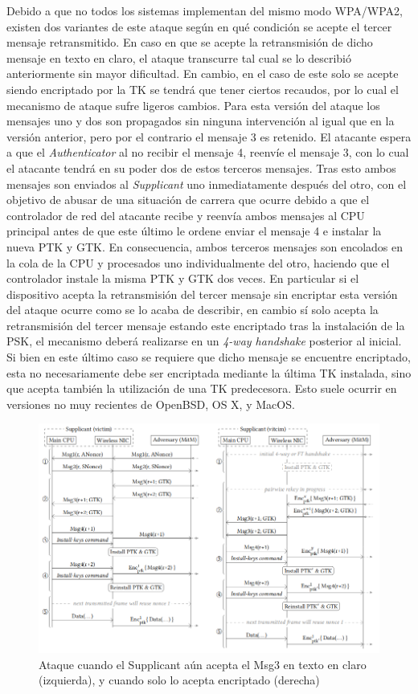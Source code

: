 \documentclass[10pt,a4paper]{article}
\begin{document}
Debido a que no todos los sistemas implementan del mismo modo WPA/WPA2, existen dos variantes de este ataque según en qué condición se acepte el tercer mensaje retransmitido. En caso en que se acepte la retransmisión de dicho mensaje en texto en claro, el ataque transcurre tal cual se lo describió anteriormente sin mayor dificultad. En cambio, en el caso de este solo se acepte siendo encriptado por la TK se tendrá que tener ciertos recaudos, por lo cual el mecanismo de ataque sufre ligeros cambios. Para esta versión del ataque los mensajes uno y dos son propagados sin ninguna intervención al igual que en la versión anterior, pero por el contrario el mensaje 3 es retenido. El atacante espera a que el \textit{Authenticator} al no recibir el mensaje 4, reenvíe el mensaje 3, con lo cual el atacante tendrá en su poder dos de estos terceros mensajes. Tras esto ambos mensajes son enviados al \textit{Supplicant} uno inmediatamente después del otro, con el objetivo de abusar de una situación de carrera que ocurre debido a que el controlador de red del atacante recibe y reenvía ambos mensajes al CPU principal antes de que este último le ordene enviar el mensaje 4 e instalar la nueva PTK y GTK. En consecuencia, ambos terceros mensajes son encolados en la cola de la CPU y procesados uno individualmente del otro, haciendo que el controlador instale la misma PTK y GTK dos veces. En particular si el dispositivo acepta la retransmisión del tercer mensaje sin encriptar esta versión del ataque ocurre como se lo acaba de describir, en cambio sí solo acepta la retransmisión del tercer mensaje estando este encriptado tras la instalación de la PSK, el mecanismo deberá realizarse en un \textit{4-way handshake} posterior al inicial. Si bien en este último caso se requiere que dicho mensaje se encuentre encriptado, esta no necesariamente debe ser encriptada mediante la última TK instalada, sino que acepta también la utilización de una TK predecesora. Esto suele ocurrir en versiones no muy recientes de OpenBSD, OS X, y MacOS.

\begin{figure}[H]
\centerline{\includegraphics[scale=0.7]{images/krack_reinstalation_nonce.png}}
\caption{Ataque cuando el Supplicant aún acepta el Msg3 en texto en claro (izquierda), y cuando solo lo acepta encriptado (derecha)}
\end{figure}
\end{document}
